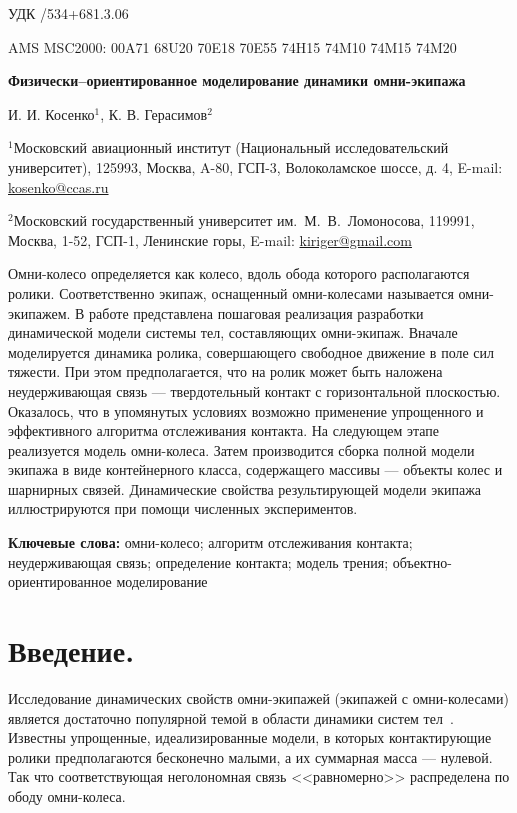 \documentclass[12pt,a4paper]{article}
\newcommand{\class}[1]{\noindent УДК \medskip #1\par\smallskip }
\renewcommand{\abstract}[1]{\smallskip #1\par\smallskip }
\renewcommand{\title}[1]{\begin{center}{\bf #1}\end{center}}
\renewcommand{\author}[1]{\centerline{#1}}
\newcommand{\MSCindex}[1]{\noindent AMS MSC2000: \smallskip #1\par\smallskip }
\newcommand{\keywordsrus}[1]{{\bf Ключевые слова:}\smallskip #1\par\smallskip }
\begin{document}
\large

\class{531/534+681.3.06}
\MSCindex{00A71 68U20 70E18 70E55 74H15 74M10 74M15 74M20}
  
\title{Физически--ориентированное моделирование динамики омни-экипажа}

\author{И. И. Косенко${}^1$, К. В. Герасимов${}^2$}
\begin{center}
\normalsize
${}^1$Московский авиационный институт (Национальный исследовательский 
университет),
125993, Москва, A-80, ГСП-3, Волоколамское шоссе, д. 4,
E-mail: \url{kosenko@ccas.ru}

${}^2$Московский государственный университет им.~М.~В.~Ломоносова,
119991, Москва, 1-52, ГСП-1, Ленинские горы,
E-mail: \url{kiriger@gmail.com}
\large
\end{center}  

\smallskip
         
\normalsize
\abstract
{
Омни-колесо определяется как колесо, вдоль обода которого располагаются ролики.
Соответственно экипаж, оснащенный омни-колесами называется омни-экипажем. В 
работе представлена пошаговая реализация разработки динамической модели системы
тел, составляющих омни-экипаж. Вначале моделируется динамика ролика, 
совершающего свободное движение в поле сил тяжести. При этом предполагается, 
что на ролик может быть наложена неудерживающая связь --- твердотельный контакт 
с горизонтальной плоскостью. Оказалось, что в упомянутых условиях возможно 
применение упрощенного и эффективного алгоритма отслеживания контакта. На 
следующем этапе реализуется модель омни-колеса. Затем производится сборка 
полной модели экипажа в виде контейнерного класса, содержащего массивы --- 
объекты колес и шарнирных связей. Динамические свойства результирующей модели
экипажа иллюстрируются при помощи численных экспериментов.
}

\keywordsrus
{
омни-колесо; алгоритм отслеживания контакта; неудерживающая связь; определение
контакта; модель трения; объектно-ориентированное моделирование
}

\large

\bigskip

\section{Введение.\ }
\label{sec1}
Исследование динамических свойств омни-экипажей (экипажей с омни-колесами)
является достаточно популярной темой в области динамики систем 
тел~\cite{CampionBastinAndreaNovel,BorisovKilinMamaev,Kalman,Tobolar,
ZobovaTatarinov}. Известны упрощенные, идеализированные модели, в которых 
контактирующие ролики предполагаются бесконечно малыми, а их суммарная масса 
--- нулевой. Так что соответствующая неголономная связь <<равномерно>> 
распределена по ободу омни-колеса.
\end{document}
